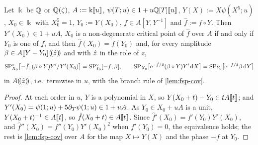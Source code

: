 \begin{lem}
\label{lem:fsp-cfu}
Let $\Bbbk$ be $\mathbb{Q}$ or $\mathbb{Q}(\zeta)$, $A:=\Bbbk[\![ u ]\!]$, $\psi(T;u)\in1+u\mathbb{Q}[T][\![ u ]\!]$, $Y(X):=X\psi(X^5;u)$, $X_0\in\Bbbk$ with $X_0^5=1$, $Y_0:=Y(X_0)$, $f\in A[Y,Y^{-1}]$ and $\hat f:=f\circ Y$. Then $Y'(X_0)\in1+uA$, $X_0$ is a non-degenerate critical point of $\hat f$ over $A$ if and only if $Y_0$ is one of $f$, and then $\hat f(X_0)=f(Y_0)$ and, for every amplitude $\beta\in A[\![ Y-Y_0 ]\!](\!(\hat{z})\!)$ and with $\hat{z}$ in the role of $z$,
\[
\mathrm{SP}^{\circ}_{X_0}\bigl[-\hat f;(\beta\circ Y)Y'/Y'(X_0)\bigr]=\mathrm{SP}^{\circ}_{Y_0}[-f;\beta],\qquad\mathrm{SP}_{X_0}\bigl[\mathrm{e}^{-\hat f/\hat{z}}(\beta\circ Y)Y'\,\mathrm{d} X\bigr]=\mathrm{SP}_{Y_0}\bigl[\mathrm{e}^{-f/\hat{z}}\beta\,\mathrm{d} Y\bigr]
\]
in $A(\!(\hat{z})\!)$, i.e.\ termwise in $u$, with the branch rule of \cref{lem:fsp-cov}.
\end{lem}

\begin{proof}
At each order in $u$, $Y$ is a polynomial in $X$, so $Y(X_0+t)-Y_0\in tA[\![ t ]\!]$; and $Y'(X_0)=\psi(1;u)+5\partial_T\psi(1;u)\in1+uA$. As $Y_0\in X_0+uA$ is a unit, $Y(X_0+t)^{-1}\in A[\![ t ]\!]$, so $\hat f(X_0+t)\in A[\![ t ]\!]$. Since $\hat f'(X_0)=f'(Y_0)Y'(X_0)$, and $\hat f''(X_0)=f''(Y_0)Y'(X_0)^2$ when $f'(Y_0)=0$, the equivalence holds; the rest is \cref{lem:fsp-cov} over $A$ for the map $X\mapsto Y(X)$ and the phase $-f$ at $Y_0$.
\end{proof}

